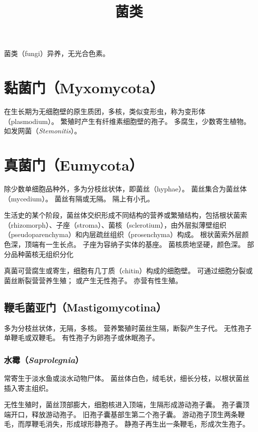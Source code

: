 \documentclass[11pt]{article}
\title{菌类}
\date{}
\begin{document}
  \maketitle

  \linenumbers
菌类（fungi）异养，无光合色素。

\section{黏菌门（Myxomycota）}
在生长期为无细胞壁的原生质团，多核，类似变形虫，称为变形体（plasmodium）。
繁殖时产生有纤维素细胞壁的孢子。
多腐生，少数寄生植物。
如发网菌（\textit{Stemonitis}）。

\section{真菌门（Eumycota）}
除少数单细胞品种外，多为分枝丝状体，即菌丝（hyphae）。
菌丝集合为菌丝体（mycedium）。
菌丝有隔或无隔。
隔上有小孔。

\newline

生活史的某个阶段，菌丝体交织形成不同结构的营养或繁殖结构，包括根状菌索（rhizomorph）、子座（stroma）、菌核（sclerotium），由外层拟薄壁组织（pseudoparenchyma）和内层疏丝组织（prosenchyma）构成。
根状菌索外层颜色深，顶端有一生长点。
子座为容纳子实体的基座。
菌核质地坚硬，颜色深。
部分品种菌核无组织分化

\newline

真菌可营腐生或寄生，细胞有几丁质（chitin）构成的细胞壁。
可通过细胞分裂或菌丝断裂营营养生殖；
或产生无性孢子。
亦营有性生殖。

\subsection{鞭毛菌亚门（Mastigomycotina）}
多为分枝丝状体，无隔，多核。
营养繁殖时菌丝生隔，断裂产生子代。
无性孢子单鞭毛或双鞭毛。
有性孢子为卵孢子或休眠孢子。

\subsubsection{水霉（\textit{Saprolegnia}）}
常寄生于淡水鱼或淡水动物尸体。
菌丝体白色，绒毛状，细长分枝，以根状菌丝插入寄主组织。

\newline

无性生殖时，菌丝顶部膨大，细胞核进入顶端，生隔形成游动孢子囊。
孢子囊顶端开口，释放游动孢子。
旧孢子囊基部生第二个孢子囊。
游动孢子顶生两条鞭毛，而厚鞭毛消失，形成球形静孢子。
静孢子再生出一条鞭毛，形成次生孢子。
\end{document}
